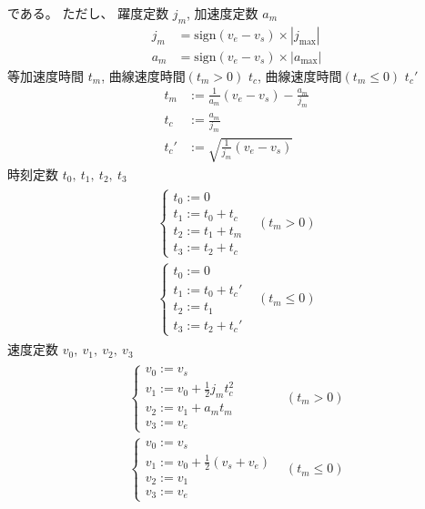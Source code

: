 \documentclass[a5paper]{ltjsarticle}
\begin{document}
である。
ただし、
躍度定数 $j_m$,
加速度定数 $a_m$
\begin{align}
    j_m & = \mathrm{sign}(v_e-v_s) \times|j_{\max}| \\
    a_m & = \mathrm{sign}(v_e-v_s) \times|a_{\max}|
\end{align}
等加速度時間 $t_m$,
曲線速度時間$(t_m>0)$ $t_c$,
曲線速度時間$(t_m\leq 0)$ $t_c'$
\begin{align}
    t_m  & := \frac{1}{a_m}(v_e - v_s) - \frac{a_m}{j_m} \\
    t_c  & := \frac{a_m}{j_m}                            \\
    t_c' & := \sqrt{\frac{1}{j_m}(v_e-v_s)}
\end{align}
時刻定数 $t_0,~t_1,~t_2,~t_3$
\begin{align}
    \begin{array}{ll}
        \left\{ \begin{array}{l}
            t_0 := 0         \\
            t_1 := t_0 + t_c \\
            t_2 := t_1 + t_m \\
            t_3 := t_2 + t_c
        \end{array} \right.
         &
        (t_m > 0)
        \\
        \left\{ \begin{array}{l}
            t_0 := 0          \\
            t_1 := t_0 + t_c' \\
            t_2 := t_1        \\
            t_3 := t_2 + t_c'
        \end{array} \right.
         &
        (t_m \leq 0)
    \end{array}
\end{align}
速度定数 $v_0,~v_1,~v_2,~v_3$
\begin{align}
    \begin{array}{ll}
        \left\{ \begin{array}{l}
            v_0 := v_s                        \\
            v_1 := v_0 + \frac{1}{2}j_m t_c^2 \\
            v_2 := v_1 + a_m t_m              \\
            v_3 := v_e
        \end{array} \right.
         &
        (t_m > 0)
        \\
        \left\{ \begin{array}{l}
            v_0 := v_s                                     \\
            v_1 := v_0 + \frac{1}{2}\left( v_s+v_e \right) \\
            v_2 := v_1                                     \\
            v_3 := v_e
        \end{array} \right.
         &
        (t_m \leq 0)
    \end{array}
\end{align}
\end{document}
